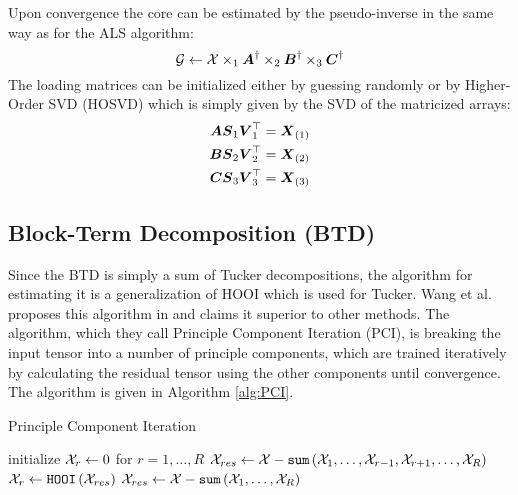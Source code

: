 Upon convergence the core can be estimated by the pseudo-inverse in the same way as for the ALS algorithm:
\begin{equation}
    \mathcal{G} \leftarrow \mathcal{X} \times_1 \boldsymbol{A}^{\dagger} \times_2 \boldsymbol{B}^{\dagger} \times_3 \boldsymbol{C}^{\dagger}
\end{equation}
The loading matrices can be initialized either by guessing randomly or by Higher-Order SVD (HOSVD) which is simply given by the SVD of the matricized arrays:
\begin{align}
    \boldsymbol{A} \boldsymbol{S}_1\boldsymbol{V}_1^{\top} &= \boldsymbol{X}_{(1)} \\
    \boldsymbol{B} \boldsymbol{S}_2\boldsymbol{V}_2^{\top} &= \boldsymbol{X}_{(2)} \\
    \boldsymbol{C} \boldsymbol{S}_3\boldsymbol{V}_3^{\top} &= \boldsymbol{X}_{(3)}
\end{align}

\subsection{Block-Term Decomposition (BTD)}
Since the BTD is simply a sum of Tucker decompositions, the algorithm for estimating it is a generalization of HOOI which is used for Tucker. Wang et al. proposes this algorithm in \cite{Wang2016} and claims it superior to other methods. The algorithm, which they call Principle Component Iteration (PCI), is breaking the input tensor into a number of principle components, which are trained iteratively by calculating the residual tensor using the other components until convergence. The algorithm is given in Algorithm \ref{alg:PCI}.
\begin{algorithm} \caption{Principle Component Iteration} \label{alg:PCI}
\begin{algorithmic}[1]
\State initialize $\mathcal{X}_r \leftarrow 0$ for $r = 1, \dots, R$
\Repeat
        \State $\mathcal{X}_{res} \leftarrow \mathcal{X} - \texttt{sum}\left( \mathcal{X}_1, \dots, \mathcal{X}_{r-1}, \mathcal{X}_{r+1},\dots, \mathcal{X}_R \right)$ 
        \State $\mathcal{X}_r \leftarrow \texttt{HOOI} \left( \mathcal{X}_{res}\right)$ 
    \EndFor
    \State $\mathcal{X}_{res} \leftarrow \mathcal{X} - \texttt{sum}\left( \mathcal{X}_1, \dots, \mathcal{X}_R \right)$
\State {}
\EndProcedure
\end{algorithmic}
\end{algorithm}


